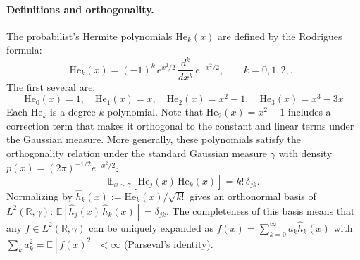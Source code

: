 \paragraph{Definitions and orthogonality.}
The probabilist's Hermite polynomials $\mathrm{He}_k(x)$ are defined by the Rodrigues formula:
\begin{equation}
    \mathrm{He}_k(x) = (-1)^k\, e^{x^2/2}\, \frac{d^k}{dx^k}\, e^{-x^2/2}, \qquad k = 0, 1, 2, \ldots
\end{equation}
The first several are:
\begin{equation}
    \mathrm{He}_0(x) = 1, \quad \mathrm{He}_1(x) = x, \quad \mathrm{He}_2(x) = x^2 - 1, \quad \mathrm{He}_3(x) = x^3 - 3x
\end{equation}
Each $\mathrm{He}_k$ is a degree-$k$ polynomial.
Note that $\mathrm{He}_2(x) = x^2 - 1$ includes a correction term that makes it orthogonal to the constant and linear terms under the Gaussian measure.
More generally, these polynomials satisfy the orthogonality relation under the standard Gaussian measure $\gamma$ with density $p(x) = (2\pi)^{-1/2}e^{-x^2/2}$:
\begin{equation}
    \mathbb{E}_{x \sim \gamma}\!\left[\mathrm{He}_j(x)\,\mathrm{He}_k(x)\right] = k!\,\delta_{jk}.
\end{equation}
Normalizing by $\hat{h}_k(x) := \mathrm{He}_k(x)/\sqrt{k!}$ gives an orthonormal basis of $L^2(\mathbb{R}, \gamma)$: $\mathbb{E}[\hat{h}_j(x)\,\hat{h}_k(x)] = \delta_{jk}$.
The completeness of this basis means that any $f \in L^2(\mathbb{R}, \gamma)$ can be uniquely expanded as $f(x) = \sum_{k=0}^\infty a_k \hat{h}_k(x)$ with $\sum_k a_k^2 = \mathbb{E}[f(x)^2] < \infty$ (Parseval's identity).

